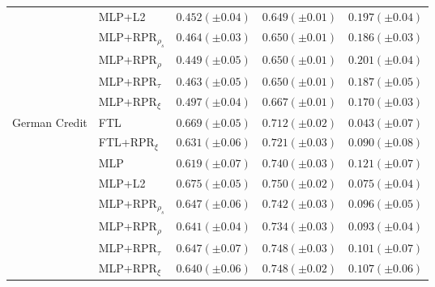 \begin{tabular}{lllll}
 & MLP+L2 & $0.452 (\pm0.04)$ & $0.649 (\pm0.01)$ & $0.197 (\pm0.04)$ \\
 & MLP+RPR$_{\rho_s}$ & $0.464 (\pm0.03)$ & $0.650 (\pm0.01)$ & $0.186 (\pm0.03)$ \\
 & MLP+RPR$_{\rho}$ & $0.449 (\pm0.05)$ & $0.650 (\pm0.01)$ & $0.201 (\pm0.04)$ \\
 & MLP+RPR$_{\tau}$ & $0.463 (\pm0.05)$ & $0.650 (\pm0.01)$ & $0.187 (\pm0.05)$ \\
 & MLP+RPR$_{\xi}$ & $0.497 (\pm0.04)$ & $0.667 (\pm0.01)$ & $0.170 (\pm0.03)$ \\
\cline{1-5}
\multirow[t]{8}{*}{German Credit} & FTL & $0.669 (\pm0.05)$ & $0.712 (\pm0.02)$ & $0.043 (\pm0.07)$ \\
 & FTL+RPR$_{\xi}$ & $0.631 (\pm0.06)$ & $0.721 (\pm0.03)$ & $0.090 (\pm0.08)$ \\
 & MLP & $0.619 (\pm0.07)$ & $0.740 (\pm0.03)$ & $0.121 (\pm0.07)$ \\
 & MLP+L2 & $0.675 (\pm0.05)$ & $0.750 (\pm0.02)$ & $0.075 (\pm0.04)$ \\
 & MLP+RPR$_{\rho_s}$ & $0.647 (\pm0.06)$ & $0.742 (\pm0.03)$ & $0.096 (\pm0.05)$ \\
 & MLP+RPR$_{\rho}$ & $0.641 (\pm0.04)$ & $0.734 (\pm0.03)$ & $0.093 (\pm0.04)$ \\
 & MLP+RPR$_{\tau}$ & $0.647 (\pm0.07)$ & $0.748 (\pm0.03)$ & $0.101 (\pm0.07)$ \\
 & MLP+RPR$_{\xi}$ & $0.640 (\pm0.06)$ & $0.748 (\pm0.02)$ & $0.107 (\pm0.06)$ \\
\cline{1-5}
\bottomrule
\end{tabular}
